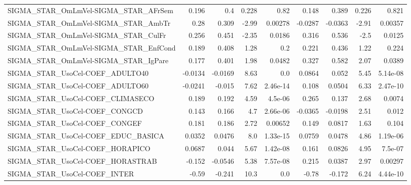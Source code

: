 \begin{tabular}{lrrrrrrrr}
SIGMA\_STAR\_OmLmVel-SIGMA\_STAR\_AFrSem  &       0.196 &          0.4 &    0.228 &     0.82 &      0.148 &       0.389 &        0.226 &         0.821 \\
SIGMA\_STAR\_OmLmVel-SIGMA\_STAR\_AmbTr   &        0.28 &        0.309 &    -2.99 &  0.00278 &    -0.0287 &     -0.0363 &        -2.91 &       0.00357 \\
SIGMA\_STAR\_OmLmVel-SIGMA\_STAR\_CulFr   &       0.256 &        0.451 &    -2.35 &   0.0186 &      0.316 &       0.536 &         -2.5 &        0.0125 \\
SIGMA\_STAR\_OmLmVel-SIGMA\_STAR\_EnfCond &       0.189 &        0.408 &     1.28 &      0.2 &      0.221 &       0.436 &         1.22 &         0.224 \\
SIGMA\_STAR\_OmLmVel-SIGMA\_STAR\_IgPare  &       0.177 &        0.401 &     1.98 &   0.0482 &      0.327 &       0.582 &         2.07 &        0.0389 \\
SIGMA\_STAR\_UsoCel-COEF\_ADULTO40       &     -0.0134 &      -0.0169 &     8.63 &      0.0 &     0.0864 &       0.052 &         5.45 &      5.14e-08 \\
SIGMA\_STAR\_UsoCel-COEF\_ADULTO60       &     -0.0241 &       -0.015 &     7.62 & 2.46e-14 &      0.108 &      0.0504 &         6.33 &      2.47e-10 \\
SIGMA\_STAR\_UsoCel-COEF\_CLIMASECO      &       0.189 &        0.192 &     4.59 &  4.5e-06 &      0.265 &       0.137 &         2.68 &        0.0074 \\
SIGMA\_STAR\_UsoCel-COEF\_CONGCD         &       0.143 &        0.166 &      4.7 & 2.66e-06 &    -0.0365 &     -0.0198 &         2.51 &         0.012 \\
SIGMA\_STAR\_UsoCel-COEF\_CONGEF         &       0.181 &        0.186 &     2.72 &  0.00652 &      0.149 &      0.0817 &         1.63 &         0.104 \\
SIGMA\_STAR\_UsoCel-COEF\_EDUC\_BASICA    &      0.0352 &       0.0476 &      8.0 & 1.33e-15 &     0.0759 &      0.0478 &         4.86 &      1.19e-06 \\
SIGMA\_STAR\_UsoCel-COEF\_HORAPICO       &      0.0687 &        0.044 &     5.67 & 1.42e-08 &      0.161 &      0.0826 &         4.95 &       7.5e-07 \\
SIGMA\_STAR\_UsoCel-COEF\_HORASTRAB      &      -0.152 &      -0.0546 &     5.38 & 7.57e-08 &      0.215 &      0.0387 &         2.97 &       0.00297 \\
SIGMA\_STAR\_UsoCel-COEF\_INTER          &       -0.59 &       -0.241 &     10.3 &      0.0 &      -0.78 &      -0.172 &         6.24 &      4.44e-10 \\

\end{tabular}
